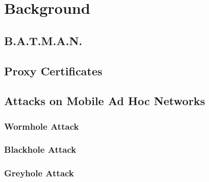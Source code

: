 \chapter{Background}

\section{B.A.T.M.A.N.}

\section{Proxy Certificates}

\section{Attacks on Mobile Ad Hoc Networks}
\subsection{Wormhole Attack}
\subsection{Blackhole Attack}
\subsection{Greyhole Attack}
